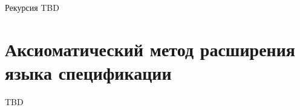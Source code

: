 \documentclass[hyperref={unicode=true}]{beamer}
\begin{document}
    \begin{frame}{Рекурсия}
    TBD
    \end{frame}

    \section{Аксиоматический метод расширения языка спецификации}

    \begin{frame}{}
    TBD
    \end{frame}
\end{document}
